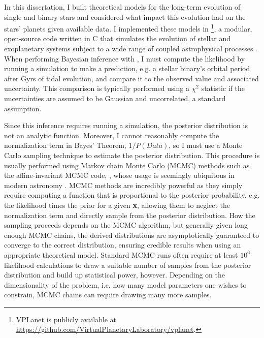 In this dissertation, I built theoretical models for the long-term evolution of single and binary stars and considered what impact this evolution had on the stars' planets given available data. I implemented these models in \vplanet\footnote{VPLanet is publicly available
at \href{https://github.com/VirtualPlanetaryLaboratory/vplanet}{{https://github.com/VirtualPlanetaryLaboratory/vplanet}}.}, a modular, open-source code written in C that simulates the evolution of stellar and exoplanetary systems subject to a wide range of coupled astrophysical processes \citep{Barnes2019}. When performing Bayesian inference with \vplanet, I must compute the likelihood by running a simulation to make a prediction, e.g. a stellar binary's orbital period after Gyrs of tidal evolution, and compare it to the observed value and associated uncertainty. This comparison is typically performed using a $\chi^2$ statistic if the uncertainties are assumed to be Gaussian and uncorrelated, a standard assumption. 

Since this inference requires running a \vplanet simulation, the posterior distribution is not an analytic function. Moreover, I cannot reasonably compute the normalization term in Bayes' Theorem, $1/P(Data)$, so I must use a Monte Carlo sampling technique to estimate the posterior distribution. This procedure is usually performed using Markov chain Monte Carlo (MCMC) methods such as the affine-invariant MCMC code, \emcee, whose usage is seemingly ubiquitous in modern astronomy \citep{ForemanMackey2013}. MCMC methods are incredibly powerful as they simply require computing a function that is proportional to the posterior probability, e.g. the likelihood times the prior for a given \textbf{x}, allowing them to neglect the normalization term and directly sample from the posterior distribution. How the sampling proceeds depends on the MCMC algorithm, but generally given long enough MCMC chains, the derived distributions are asymptotically guaranteed to converge to the correct distribution, ensuring credible results when using an appropriate theoretical model. Standard MCMC runs often require at least $10^6$ likelihood calculations to draw a suitable number of samples from the posterior distribution and build up statistical power, however. Depending on the dimensionality of the problem, i.e. how many model parameters one wishes to constrain, MCMC chains can require drawing many more samples.

